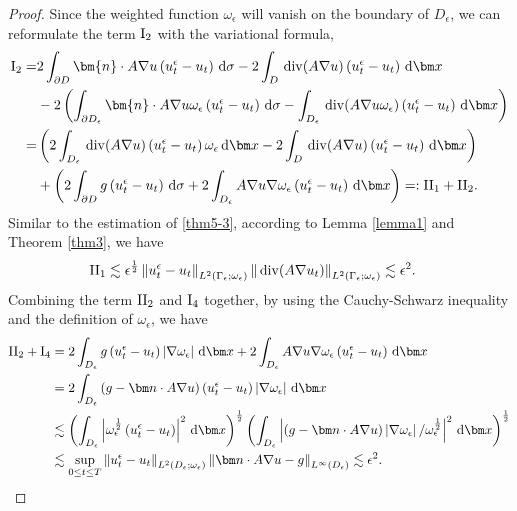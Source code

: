 \documentclass[3p,times]{elsarticle}
\numberwithin{equation}{section}
\newcommand{\dd}{\,{\rm d}}
\newcommand{\divo}{\,{\rm div}}
\begin{document}
\begin{proof}
	Since the weighted function $\omega_{\epsilon}$ will vanish on the boundary of $D_{\epsilon}$, we can reformulate the term $\rm{I}_2$ with the variational formula, 
	\begin{equation*}
		\begin{aligned}
			\label{thm5-4}
			\rm{I}_2 =& 2\int_{\partial D} \bm{n}\cdot A\nabla u\left(u_t^{\epsilon}-u_t\right)\dd\sigma - 2\int_D\divo(A\nabla u)\left(u_t^{\epsilon}-u_t\right)\dd\bm x\\
			&-2\left(\int_{\partial D_{\epsilon}}\bm{n}\cdot A\nabla u\omega_{\epsilon}\left(u_t^{\epsilon}-u_t\right)\dd\sigma-\int_{D_{\epsilon}}\divo(A\nabla u\omega_{\epsilon})\left(u_t^{\epsilon}-u_t\right)\dd\bm x \right)\\
			=&\left(2\int_{D_{\epsilon}}\divo(A\nabla u)\left(u_t^{\epsilon}-u_t\right)\omega_{\epsilon}\dd\bm x-2\int_D\divo(A\nabla u)\left(u_t^{\epsilon}-u_t\right)\dd\bm x \right)\\
			&+\left(2\int_{\partial D} g\left(u_t^{\epsilon}-u_t\right)\dd\sigma+2\int_{D_{\epsilon}}A\nabla u\nabla\omega_{\epsilon}\left(u_t^{\epsilon}-u_t\right)\dd\bm x \right)=:\rm{II}_1+\rm{II}_2.
		\end{aligned}
	\end{equation*}
	Similar to the estimation of \eqref{thm5-3}, according to Lemma \ref{lemma1} and Theorem \ref{thm3}, we have
	\begin{equation}
		\begin{aligned}
			\label{thm5-5}
			\rm{II}_1 &\lesssim\epsilon^{\frac 1 2}\left\|u_t^{\epsilon}-u_t\right\|_{L^2(\Gamma_{\epsilon};\omega_{\epsilon})}\left\|\divo(A\nabla u_t)\right\|_{L^2(\Gamma_{\epsilon};\omega_{\epsilon})}\lesssim \epsilon^2.
		\end{aligned}
	\end{equation}
	Combining the term $\rm{II}_2$ and $\rm{I}_4$ together, by using the Cauchy-Schwarz inequality and the definition of $\omega_{\epsilon}$, we have 
	\begin{equation}
		\begin{aligned}
			\label{thm5-6}
			\rm{II}_2+\rm{I}_4 &= 2\int_{D_{\epsilon}}g\left(u_t^{\epsilon}-u_t\right)\left|\nabla \omega_{\epsilon}\right|\dd\bm x+2\int_{D_{\epsilon}}A\nabla u\nabla \omega_{\epsilon}\left(u_t^{\epsilon}-u_t\right)\dd\bm x\\
			&=2\int_{D_{\epsilon}} \left(g-\bm n \cdot A\nabla u\right)\left(u_t^{\epsilon}-u_t\right)\left|\nabla \omega_{\epsilon}\right|\dd\bm x\\
			&\lesssim \left(\int_{D_{\epsilon}} \left|\omega_{\epsilon}^{\frac 1 2}\left(u_t^{\epsilon}-u_t\right)\right|^2\dd\bm x\right)^{\frac 1 2}\left(\int_{D_{\epsilon}}\left|\left(g-\bm n\cdot A \nabla u\right)\left|\nabla \omega_{\epsilon}\right|/\omega_{\epsilon}^{\frac 1 2} \right|^2\dd\bm x \right)^{\frac 1 2}\\
			&\lesssim \sup\limits_{0\leq t \leq T} \left\|u_t^{\epsilon}-u_t\right\|_{L^2(D_{\epsilon};\omega_{\epsilon})}\left\|\bm n\cdot  A\nabla u-g\right\|_{L^{\infty}(D_{\epsilon})}\lesssim \epsilon^2.
		\end{aligned}
	\end{equation}
	

\end{proof}
\end{document}
